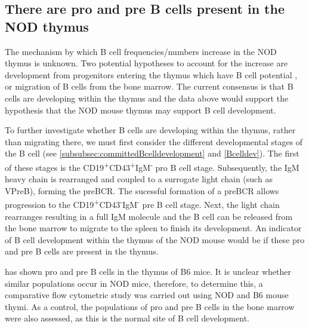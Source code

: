 \subsection{There are pro and pre B cells present in the NOD thymus}
\label{subsec:proandpre}

The mechanism by which B cell frequencies/numbers increase in the NOD thymus is unknown. 
Two potential hypotheses to account for the increase are development from progenitors entering the thymus which have B cell potential \citep{Porritt2004, Akashi2000}, or migration of B cells from the bone marrow.
The current consensus is that B cells are developing within the thymus and the data above would support the hypothesis that the NOD mouse thymus may support B cell development. 

To further investigate whether B cells are developing within the thymus, rather than migrating there, we must first consider the different developmental stages of the B cell (see \cref{subsubsec:committedBcelldevelopment} and \cref{Bcelldev}).
The first of these stages is the CD19\textsuperscript{+}CD43\textsuperscript{+}IgM\textsuperscript{-} pro B cell stage.
Subsequently, the IgM heavy chain is rearranged and coupled to a surrogate light chain (such as VPreB), forming the preBCR.
The sucessful formation of a preBCR allows progression to the CD19\textsuperscript{+}CD43\textsuperscript{-}IgM\textsuperscript{-} pre B cell stage.
Next, the light chain rearranges resulting in a full IgM molecule and the B cell can be released from the bone marrow to migrate to the spleen to finish its development.
An indicator of B cell development within the thymus of the NOD mouse would be if these pro and pre B cells are present in the thymus. 


\citet{Akashi2000} has shown pro and pre B cells in the thymus of B6 mice.
It is unclear whether similar populations occur in NOD mice, therefore, to determine this, a comparative flow cytometric study was carried out using NOD and B6 mouse thymi.
As a control, the populations of pro and pre B cells in the bone marrow were also assessed, as this is the normal site of B cell development.


